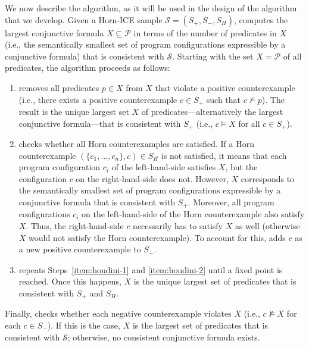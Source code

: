 We now describe the \houdini algorithm, as it will be used in the design of the \sorcar algorithm that we develop.
Given a Horn-ICE sample $\mathcal S = (S_+, S_-, S_H)$, \houdini computes the largest conjunctive formula $X \subseteq \mathcal P$ in terms of the number of predicates in $X$ (i.e., the semantically smallest set of program configurations expressible by a conjunctive formula) that is consistent with $\mathcal S$.
Starting with the set $X = \mathcal P$ of all predicates, the \houdini algorithm proceeds as follows:
\begin{enumerate}
    \item \label{item:houdini-1} \houdini removes all predicates $p \in X$ from $X$ that violate a positive counterexample (i.e., there exists a positive counterexample $c \in S_+$ such that $c \not\models p$).
    The result is the unique largest set $X$ of predicates---alternatively the largest conjunctive formula---that is consistent with $S_+$ (i.e., $c \models X$ for all $c \in S_+$).
    \item \label{item:houdini-2} \houdini checks whether all Horn counterexamples are satisfied.
    If a Horn counterexample $(\{ c_1, \ldots, c_n \}, c) \in S_H$ is not satisfied, it means that each program configuration $c_i$ of the left-hand-side satisfies $X$, but the configuration $c$ on the right-hand-side does not.
    However, $X$ corresponds to the semantically smallest set of program configurations expressible by a conjunctive formula that is consistent with $S_+$.
    Moreover, all program configurations $c_i$ on the left-hand-side of the Horn counterexample also satisfy $X$.
    Thus, the right-hand-side $c$ necessarily has to satisfy $X$ as well (otherwise $X$ would not satisfy the Horn counterexample).
    To account for this, \houdini adds $c$ as a new positive counterexample to $S_+$.
    \item \label{item:houdini-3} \houdini repeats Steps~\ref{item:houdini-1} and \ref{item:houdini-2} until a fixed point is reached. Once this happens, $X$ is the unique largest set of predicates that is consistent with $S_+$ and $S_H$.
\end{enumerate}
Finally, \houdini checks whether each negative counterexample violates $X$ (i.e., $c \not\models X$ for each $c \in S_-$).
If this is the case, $X$ is the largest set of predicates that is consistent with $\mathcal S$; otherwise, no consistent conjunctive formula exists.


